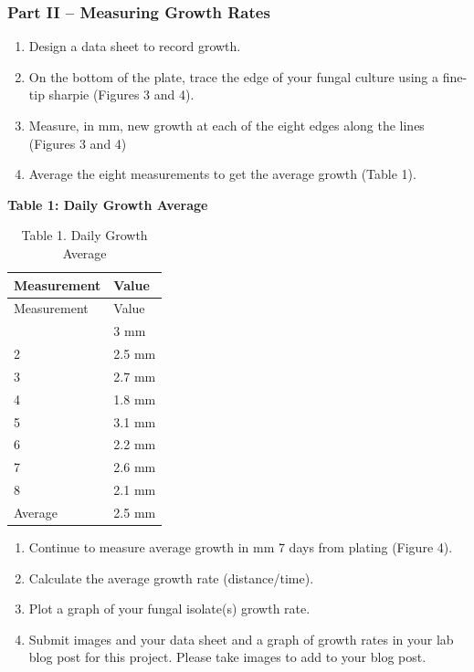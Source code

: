 \documentclass[
  letterpaper,
  DIV=11,
  numbers=noendperiod]{scrreprt}
\providecommand{\tightlist}{%
  \setlength{\itemsep}{0pt}\setlength{\parskip}{0pt}}
\begin{document}
\subsubsection*{Part II -- Measuring Growth
Rates}\label{part-ii-measuring-growth-rates}

\begin{enumerate}
\def\labelenumi{\arabic{enumi}.}
\tightlist
\item
  Design a data sheet to record growth.
\item
  On the bottom of the plate, trace the edge of your fungal culture
  using a fine-tip sharpie (Figures 3 and 4).
\item
  Measure, in mm, new growth at each of the eight edges along the lines
  (Figures 3 and 4)
\item
  Average the eight measurements to get the average growth (Table 1).
\end{enumerate}

\textbf{Table 1: Daily Growth Average}

\begin{longtable}[]{@{}ll@{}}
\caption{Table 1. Daily Growth Average}\tabularnewline
\toprule\noalign{}
Measurement & Value \\
\midrule\noalign{}
\endfirsthead
\toprule\noalign{}
Measurement & Value \\
\midrule\noalign{}
\endhead
\bottomrule\noalign{}
\endlastfoot
1 & 3 mm \\
2 & 2.5 mm \\
3 & 2.7 mm \\
4 & 1.8 mm \\
5 & 3.1 mm \\
6 & 2.2 mm \\
7 & 2.6 mm \\
8 & 2.1 mm \\
Average & 2.5 mm \\
\end{longtable}

\begin{enumerate}
\def\labelenumi{\arabic{enumi}.}
\setcounter{enumi}{4}
\tightlist
\item
  Continue to measure average growth in mm 7 days from plating (Figure
  4).
\item
  Calculate the average growth rate (distance/time).
\item
  Plot a graph of your fungal isolate(s) growth rate.
\item
  Submit images and your data sheet and a graph of growth rates in your
  lab blog post for this project. Please take images to add to your blog
  post.
\end{enumerate}
\end{document}
